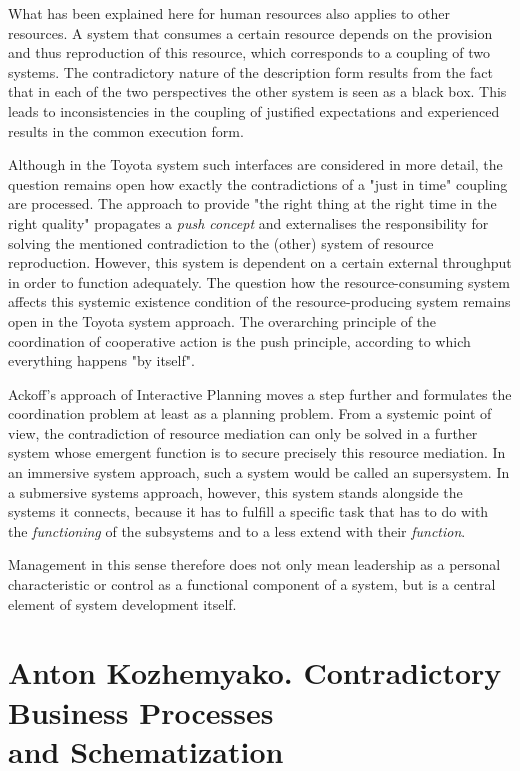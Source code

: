 \documentclass[11pt,a4paper]{article}
\begin{document}
What has been explained here for human resources also applies to other
resources. A system that consumes a certain resource depends on the provision
and thus reproduction of this resource, which corresponds to a coupling of two
systems. The contradictory nature of the description form results from the
fact that in each of the two perspectives the other system is seen as a black
box. This leads to inconsistencies in the coupling of justified expectations
and experienced results in the common execution form.

Although in the Toyota system such interfaces are considered in more detail,
the question remains open how exactly the contradictions of a "just in time"
coupling are processed. The approach to provide "the right thing at the right
time in the right quality" propagates a \emph{push concept} and externalises
the responsibility for solving the mentioned contradiction to the (other)
system of resource reproduction. However, this system is dependent on a
certain external throughput in order to function adequately. The question how
the resource-consuming system affects this systemic existence condition of the
resource-producing system remains open in the Toyota system approach. The
overarching principle of the coordination of cooperative action is the push
principle, according to which everything happens "by itself".

Ackoff's approach of Interactive Planning moves a step further and formulates
the coordination problem at least as a planning problem. From a systemic point
of view, the contradiction of resource mediation can only be solved in a
further system whose emergent function is to secure precisely this resource
mediation. In an immersive system approach, such a system would be called an
supersystem. In a submersive systems approach, however, this system stands
alongside the systems it connects, because it has to fulfill a specific task
that has to do with the \emph{functioning} of the subsystems and to a less
extend with their \emph{function}.

Management in this sense therefore does not only mean leadership as a personal
characteristic or control as a functional component of a system, but is a
central element of system development itself.

\section{Anton Kozhemyako. Contradictory Business Processes\\ and
  Schematization}
\end{document}
